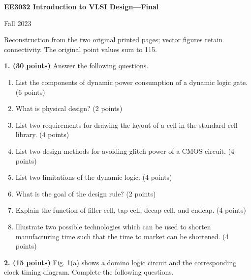 \documentclass[10pt]{article}
\begin{document}
\begin{center}{\large\bfseries EE3032 Introduction to VLSI Design---Final}\par Fall 2023\end{center}
\small Reconstruction from the two original printed pages; vector figures retain connectivity. The original point values sum to 115.\normalsize\par
\textbf{1. (30 points)} Answer the following questions.
\begin{enumerate}[label=(\alph*),leftmargin=7mm,itemsep=3pt]
\item List the components of dynamic power consumption of a dynamic logic gate. (6 points)
\item What is physical design? (2 points)
\item List two requirements for drawing the layout of a cell in the standard cell library. (4 points)
\item List two design methods for avoiding glitch power of a CMOS circuit. (4 points)
\item List two limitations of the dynamic logic. (4 points)
\item What is the goal of the design rule? (2 points)
\item Explain the function of filler cell, tap cell, decap cell, and endcap. (4 points)
\item Illustrate two possible technologies which can be used to shorten manufacturing time such that the time to market can be shortened. (4 points)
\end{enumerate}\textbf{2. (15 points)} Fig. 1(a) shows a domino logic circuit and the corresponding clock timing diagram. Complete the following questions.
\end{document}
